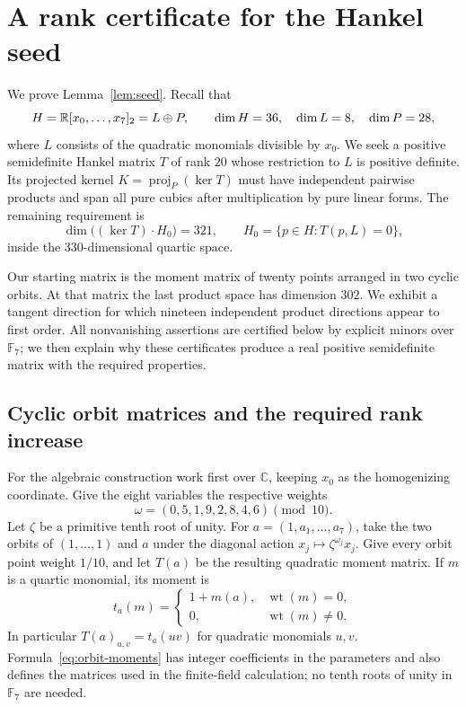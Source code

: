 \section{A rank certificate for the Hankel seed}
\label{app:certificate}

We prove Lemma~\ref{lem:seed}.  Recall that
\[
 H=\mathbb R[x_0,\ldots,x_7]_2=L\oplus P,
 \qquad \dim H=36,\quad \dim L=8,\quad \dim P=28,
\]
where $L$ consists of the quadratic monomials divisible by $x_0$.
We seek a positive semidefinite Hankel matrix $T$ of rank $20$ whose
restriction to $L$ is positive definite.  Its projected kernel
$K=\operatorname{proj}_P(\ker T)$ must have independent pairwise
products and span all pure cubics after multiplication by pure linear
forms.  The remaining requirement is
\[
 \dim\bigl((\ker T)\cdot H_0\bigr)=321,
 \qquad H_0=\{p\in H:T(p,L)=0\},
\]
inside the $330$-dimensional quartic space.

Our starting matrix is the moment matrix of twenty points arranged in
two cyclic orbits.  At that matrix the last product space has dimension
$302$.  We exhibit a tangent direction for which nineteen independent
product directions appear to first order.  All nonvanishing assertions
are certified below by explicit minors over $\mathbb F_7$; we then
explain why these certificates produce a real positive semidefinite
matrix with the required properties.

\subsection{Cyclic orbit matrices and the required rank increase}
\label{subsec:orbit-seed}

For the algebraic construction work first over $\mathbb C$, keeping
$x_0$ as the homogenizing coordinate.  Give the eight variables the
respective weights
\begin{equation}
 \omega=(0,5,1,9,2,8,4,6)\pmod {10}.
 \label{eq:certificate-weights}
\end{equation}
Let $\zeta$ be a primitive tenth root of unity.  For
$a=(1,a_1,\ldots,a_7)$, take the two orbits of $(1,\ldots,1)$ and $a$
under the diagonal action
$x_j\mapsto\zeta^{\omega_j}x_j$.
Give every orbit point weight $1/10$, and let $T(a)$ be the resulting
quadratic moment matrix.  If $m$ is a quartic monomial, its moment is
\begin{equation}
 t_a(m)=
 \begin{cases}
  1+m(a),&\operatorname{wt}(m)=0,\\
  0,&\operatorname{wt}(m)\ne0.
 \end{cases}
 \label{eq:orbit-moments}
\end{equation}
In particular $T(a)_{u,v}=t_a(uv)$ for quadratic monomials $u,v$.
Formula~\eqref{eq:orbit-moments} has integer coefficients in the
parameters and also defines the matrices used in the finite-field
calculation; no tenth roots of unity in $\mathbb F_7$ are needed.


